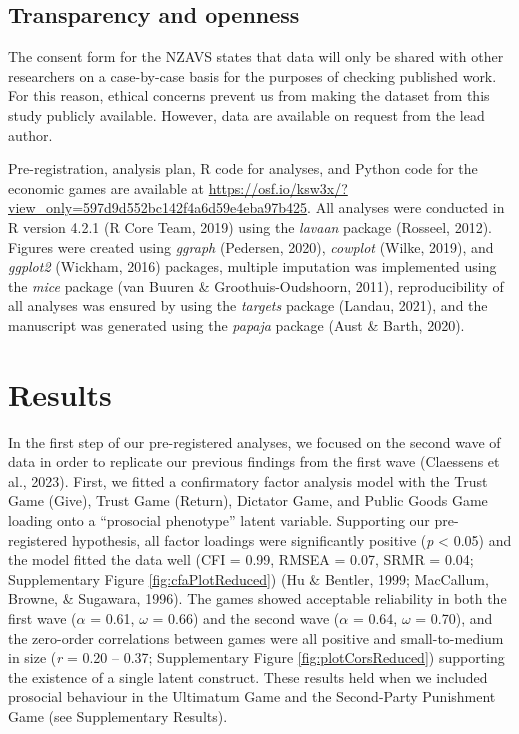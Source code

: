 \documentclass[
  man,floatsintext]{apa6}
\begin{document}
\hypertarget{transparency-and-openness}{%
\subsection{Transparency and openness}\label{transparency-and-openness}}

The consent form for the NZAVS states that data will only be shared with other
researchers on a case-by-case basis for the purposes of checking published work.
For this reason, ethical concerns prevent us from making the dataset from this
study publicly available. However, data are available on request from the lead
author.

Pre-registration, analysis plan, R code for analyses, and Python code for the
economic games are available at
\url{https://osf.io/ksw3x/?view_only=597d9d552bc142f4a6d59e4eba97b425}. All analyses
were conducted in R version 4.2.1 (R Core Team, 2019) using the \emph{lavaan} package
(Rosseel, 2012). Figures were created using \emph{ggraph} (Pedersen, 2020), \emph{cowplot}
(Wilke, 2019), and \emph{ggplot2} (Wickham, 2016) packages, multiple imputation was
implemented using the \emph{mice} package (van Buuren \& Groothuis-Oudshoorn, 2011), reproducibility of all analyses
was ensured by using the \emph{targets} package (Landau, 2021), and the manuscript was
generated using the \emph{papaja} package (Aust \& Barth, 2020).

\hypertarget{results}{%
\section{Results}\label{results}}

In the first step of our pre-registered analyses, we focused on the
second wave of data in order to replicate our previous findings from the first
wave (Claessens et al., 2023). First, we fitted a confirmatory factor analysis model
with the Trust Game (Give), Trust Game (Return), Dictator Game, and Public
Goods Game loading onto a ``prosocial phenotype'' latent variable. Supporting
our pre-registered hypothesis, all factor loadings were significantly
positive (\emph{p} \textless{} 0.05) and the model fitted the data well (CFI =
0.99, RMSEA =
0.07, SRMR =
0.04; Supplementary Figure
\ref{fig:cfaPlotReduced}) (Hu \& Bentler, 1999; MacCallum, Browne, \& Sugawara, 1996). The games showed
acceptable reliability in both the first wave (\(\alpha\) =
0.61, \(\omega\) =
0.66) and the second wave
(\(\alpha\) = 0.64, \(\omega\) =
0.70), and the zero-order
correlations between games were all positive and small-to-medium in size
(\emph{r} = 0.20 -- 0.37; Supplementary Figure \ref{fig:plotCorsReduced}) supporting
the existence of a single latent construct. These results held when we included
prosocial behaviour in the Ultimatum Game and the Second-Party Punishment Game
(see Supplementary Results).
\end{document}
